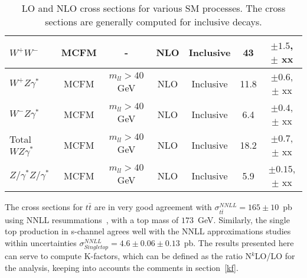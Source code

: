 \begin{table}[hbt]
\begin{center}
\begin{tabular}{|l|c|c|c|c|c|c|}
$W^+W^-$ & MCFM & - & NLO & Inclusive & 43 & $\pm 1.5$, $\pm$ xx \\ \hline
$W^+Z\gamma^*$ & MCFM & $m_{ll} > 40$ GeV & NLO & Inclusive & 11.8 & $\pm 0.6$, $\pm$ xx \\ \hline
$W^-Z\gamma^*$ & MCFM & $m_{ll} > 40$ GeV & NLO & Inclusive & 6.4 & $\pm 0.4$, $\pm$ xx \\ \hline
Total $WZ\gamma^*$ & MCFM & $m_{ll} > 40$ GeV & NLO & Inclusive & 18.2 & $\pm 0.7$, $\pm$ xx \\ \hline
$Z/\gamma^*Z/\gamma^*$ & MCFM & $m_{ll} > 40$ GeV & NLO & Inclusive & 5.9 & $\pm 0.15$, $\pm$ xx \\ \hline
\end{tabular} 
\caption{LO and NLO cross sections for various SM processes. The cross sections are generally
computed for inclusive decays. \label{tab:nlo}}
\end{center}
\end{table}

The cross sections for $t\bar{t}$ are in very good agreement with 
$\sigma^{NNLL}_{t\bar{t}} = 165 \pm 10$~pb using NNLL 
resummations~\cite{nnllttbar}, with a top mass of $173$~GeV. Similarly, the 
single top production in s-channel agrees well with the NNLL approximations 
studies~\cite{nnllschannel} within uncertainties 
$\sigma^{NNLL}_{Single top} = 4.6 \pm 0.06 \pm 0.13$~pb. The results presented 
here can serve to compute K-factors, which can be defined as the ratio 
N$^k$LO/LO for the analysis, keeping into accounts the comments in section~\ref{kf}.
